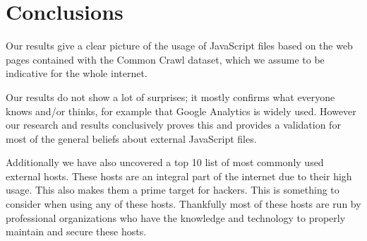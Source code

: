 \section{Conclusions}
Our results give a clear picture of the usage of JavaScript files based on the web pages contained with the Common Crawl dataset, which we assume to be indicative for the whole internet.

Our results do not show a lot of surprises; it mostly confirms what everyone knows and/or thinks, for example that Google Analytics is widely used. However our research and results conclusively proves this and provides a validation for most of the general beliefs about external JavaScript files.

Additionally we have also uncovered a top 10 list of most commonly used external hosts. These hosts are an integral part of the internet due to their high usage. This also makes them a prime target for hackers. This is something to consider when using any of these hosts. Thankfully most of these hosts are run by professional organizations who have the knowledge and technology to properly maintain and secure these hosts. \\